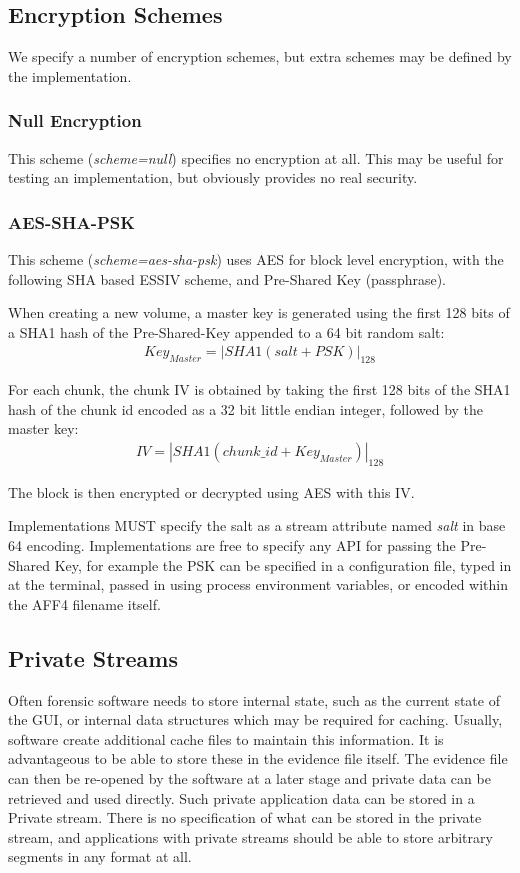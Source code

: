 \documentclass[10pt, conference]{IEEEtran}
\begin{document}
\subsection{Encryption Schemes}
We specify a number of encryption schemes, but extra schemes may be
defined by the implementation.

\subsubsection{Null Encryption}
This scheme ({\em scheme=null}) specifies no encryption at all. This
may be useful for testing an implementation, but obviously provides
no real security.

\subsubsection{AES-SHA-PSK}
This scheme ({\em scheme=aes-sha-psk}) uses AES for block level
encryption, with the following SHA based ESSIV scheme, and Pre-Shared
Key (passphrase).

When creating a new volume, a master key is generated using the first
128 bits of a SHA1 hash of the Pre-Shared-Key appended to a 64 bit
random salt:
\begin{eqnarray}
Key_{Master} = \left | SHA1(salt + PSK) \right | _{128}
\end{eqnarray}

For each chunk, the chunk IV is obtained by taking the first 128 bits
of the SHA1 hash of the chunk id encoded as a 32 bit little endian
integer, followed by the master key:
\begin{eqnarray}
IV = \left | SHA1(chunk\_id + Key_{Master}) \right | _{128}
\end{eqnarray}

The block is then encrypted or decrypted using AES with this IV.

Implementations MUST specify the salt as a stream attribute named {\em
salt} in base 64 encoding. Implementations are free to specify any API
for passing the Pre-Shared Key, for example the PSK can be specified
in a configuration file, typed in at the terminal, passed in using
process environment variables, or encoded within the AFF4 filename
itself.

\subsection{Private Streams}
Often forensic software needs to store internal state, such as the
current state of the GUI, or internal data structures which may be
required for caching. Usually, software create additional cache files
to maintain this information. It is advantageous to be able to store
these in the evidence file itself. The evidence file can then be
re-opened by the software at a later stage and private data can be
retrieved and used directly. Such private application data can be
stored in a Private stream. There is no specification of what can be
stored in the private stream, and applications with private streams
should be able to store arbitrary segments in any format at all.
\end{document}
